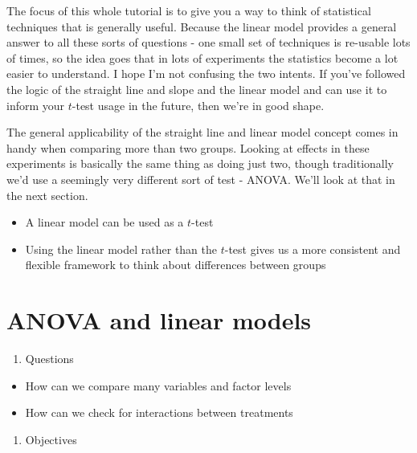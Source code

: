 \documentclass[
]{book}
\providecommand{\tightlist}{%
  \setlength{\itemsep}{0pt}\setlength{\parskip}{0pt}}
\newenvironment{task}
{ \begin{tcolorbox}[title=For you to do,title filled] }
{  \end{tcolorbox} }
\newenvironment{roundup}
{ \begin{tcolorbox}[colbacktitle=yellow!50!white,
title=Round Up,coltitle=black,
fonttitle=\bfseries] }
{  \end{tcolorbox} }
\begin{document}
The focus of this whole tutorial is to give you a way to think of statistical techniques that is generally useful. Because the linear model provides a general answer to all these sorts of questions - one small set of techniques is re-usable lots of times, so the idea goes that in lots of experiments the statistics become a lot easier to understand. I hope I'm not confusing the two intents. If you've followed the logic of the straight line and slope and the linear model and can use it to inform your \(t\)-test usage in the future, then we're in good shape.

The general applicability of the straight line and linear model concept comes in handy when comparing more than two groups. Looking at effects in these experiments is basically the same thing as doing just two, though traditionally we'd use a seemingly very different sort of test - ANOVA. We'll look at that in the next section.

\begin{roundup}
\begin{itemize}
\tightlist
\item
  A linear model can be used as a \(t\)-test
\item
  Using the linear model rather than the \(t\)-test gives us a more consistent and flexible framework to think about differences between groups
\end{itemize}
\end{roundup}

\begin{task}
\end{task}

\hypertarget{anova-and-linear-models}{%
\chapter{ANOVA and linear models}\label{anova-and-linear-models}}

\begin{enumerate}
\def\labelenumi{\arabic{enumi}.}
\tightlist
\item
  Questions
\end{enumerate}

\begin{itemize}
\tightlist
\item
  How can we compare many variables and factor levels
\item
  How can we check for interactions between treatments
\end{itemize}

\begin{enumerate}
\def\labelenumi{\arabic{enumi}.}
\setcounter{enumi}{1}
\tightlist
\item
  Objectives
\end{enumerate}
\end{document}
